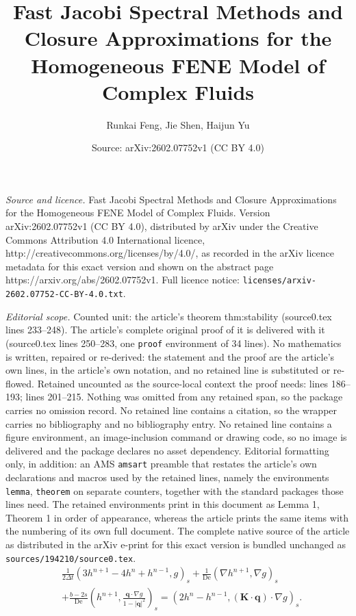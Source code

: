 \documentclass[10pt,a4paper]{amsart}
\title{Fast Jacobi Spectral Methods and Closure Approximations for the Homogeneous FENE Model of Complex Fluids}
\author{Runkai Feng, Jie Shen, Haijun Yu}
\date{Source: arXiv:2602.07752v1 (CC BY 4.0)}
\begin{document}
\maketitle

\noindent\emph{Source and licence.} Fast Jacobi Spectral Methods and Closure Approximations for the Homogeneous FENE Model of Complex Fluids. Version arXiv:2602.07752v1 (CC BY 4.0), distributed by arXiv under the Creative Commons Attribution 4.0 International licence, http://creativecommons.org/licenses/by/4.0/, as recorded in the arXiv licence metadata for this exact version and shown on the abstract page https://arxiv.org/abs/2602.07752v1. Full licence notice: \texttt{licenses/arxiv-2602.07752-CC-BY-4.0.txt}.\par\smallskip

\noindent\textit{Editorial scope.} Counted unit: the article's theorem thm:stability (source0.tex lines 233--248). The article's complete original proof of it is delivered with it (source0.tex lines 250--283, one \texttt{proof} environment of 34 lines). No mathematics is written, repaired or re-derived: the statement and the proof are the article's own lines, in the article's own notation, and no retained line is substituted or re-flowed.  Retained uncounted as the source-local context the proof needs: lines 186--193; lines 201--215.  Nothing was omitted from any retained span, so the package carries no omission record.  No retained line contains a citation, so the wrapper carries no bibliography and no bibliography entry.  No retained line contains a figure environment, an image-inclusion command or drawing code, so no image is delivered and the package declares no asset dependency.  Editorial formatting only, in addition: an AMS \texttt{amsart} preamble that restates the article's own declarations and macros used by the retained lines, namely the environments \texttt{lemma}, \texttt{theorem} on separate counters, together with the standard packages those lines need.  The retained environments print in this document as Lemma 1, Theorem 1 in order of appearance, whereas the article prints the same items with the numbering of its own full document.  The complete native source of the article as distributed in the arXiv e-print for this exact version is bundled unchanged as \texttt{sources/194210/source0.tex}.
\begin{equation} 
\label{eq:BDF2}
\begin{aligned}
    & \frac{1}{2\Delta t}\left(3h^{n+1}-4h^{n}+h^{n-1}, g\right)_s + \frac{1}{\text{De}}\left(\nabla h^{n+1},\nabla g\right)_s \\
    &+\frac{b-2s}{\text{De}}\left(h^{n+1},\frac{\bm{q}\cdot \nabla g}{1-|\bm{q}|^2}\right)_s 
    = (2h^{n}-h^{n-1}, (\bm{K}\cdot\bm{q})\cdot\nabla g)_s.
\end{aligned}
\end{equation}
\end{document}

